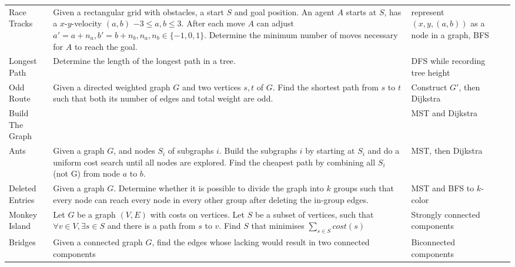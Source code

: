 \documentclass[a4paper, 10pt]{article}
\begin{document}
\begin{longtable}{ L{2cm} L{8cm} L{4cm} r}
        Race Tracks 
        & Given a rectangular grid with obstacles, a start $S$ and goal position. An agent $A$ starts at $S$, has a $x$-$y$-velocity $(a,b)$ 
            $-3\leq a,b \leq3$. After each move $A$ can adjust $a'=a+n_a, b'=b+n_b, n_a,n_b \in \{-1,0,1\}$. 
            Determine the minimum number of moves necessary for $A$ to reach the goal. 
        & represent $(x,y,(a,b))$ as a node in a graph, BFS &  \pageref{sec:race_tracks} \\

        Longest Path 
        & Determine the length of the longest path in a tree.
        & DFS while recording tree height &  \pageref{sec:longest_path} \\

        Odd Route
        & Given a directed weighted graph $G$ and two vertices $s,t$ of $G$. Find the shortest path from 
            $s$ to $t$ such that both its number of edges and total weight are odd.
        & Construct $G'$, then Dijkstra &  \pageref{sec:odd_route} \\

        Build The Graph 
        &          
        & MST and Dijkstra &  \pageref{sec:build_the_graph} \\

        Ants 
        & Given a graph $G$, and nodes $S_i$ of subgraphs $i$. 
            Build the subgraphs $i$ by starting at $S_i$ and do a uniform cost search until all nodes are explored.
            Find the cheapest path by combining all $S_i$ (not G) from node $a$ to $b$. 
        & MST, then Dijkstra &  \pageref{sec:ants} \\

        Deleted Entries 
        & Given a graph $G$. Determine whether it is possible to divide the graph into $k$ groups such that every node can reach every node in every other group
            after deleting the in-group edges.
        & MST and BFS to $k$-color &  \pageref{sec:deleted_entries} \\

        Monkey Island 
        & Let $G$ be a graph $(V,E)$ with costs on vertices. Let $S$ be a subset of vertices,
            such that $\forall v\in V,\exists s\in S$ and there is a path from  $s$ to $v$. 
            Find $S$ that minimises $\sum_{s\in S}cost(s)$ 
        & Strongly connected components &  \pageref{sec:monkey_island} \\

        Bridges 
        & Given a connected graph $G$, find the edges whose lacking would result in two connected components         
        & Biconnected components &  \pageref{sec:bridges} \\


\end{longtable}
\end{document}

